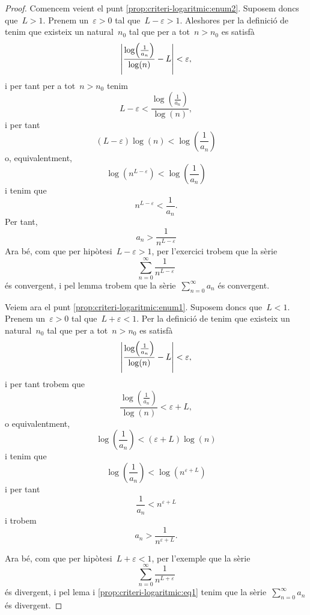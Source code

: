 \documentclass[../analisi-matematica.tex]{subfiles}
\begin{document}
    \begin{proof}
        Comencem veient el punt \eqref{prop:criteri-logaritmic:enum2}.
        Suposem doncs que~\(L>1\).
        Prenem un~\(\varepsilon>0\) tal que~\(L-\varepsilon>1\).
        Aleshores per la definició de  tenim que existeix un natural~\(n_{0}\) tal que per a tot~\(n>n_{0}\) es satisfà
        \[
            \abs{\frac{\log\left(\frac{1}{a_{n}}\right)}{\log(n)}-L}<\varepsilon,
        \]
        i per tant per a tot~\(n>n_{0}\) tenim
        \[
            L-\varepsilon<\frac{\log\left(\frac{1}{a_{n}}\right)}{\log(n)},
        \]
        i per tant
        \[
            (L-\varepsilon)\log(n)<\log\left(\frac{1}{a_{n}}\right)
        \]
        o, equivalentment,
        \[
            \log\left(n^{L-\varepsilon}\right)<\log\left(\frac{1}{a_{n}}\right)
        \]
        i tenim que %
        \[
            n^{L-\varepsilon}<\frac{1}{a_{n}}.
        \]
        Per tant,
        \[
            a_{n}>\frac{1}{n^{L-\varepsilon}}
        \]
        Ara bé, com que per hipòtesi~\(L-\varepsilon>1\), per l'exercici  trobem que la sèrie
        \[
            \sum_{n=0}^{\infty}\frac{1}{n^{L-\varepsilon}}
        \]
        és convergent, i pel lemma  trobem que la sèrie~\(\sum_{n=0}^{\infty}a_{n}\) és convergent.

        Veiem ara el punt \eqref{prop:criteri-logaritmic:enum1}.
        Suposem doncs que~\(L<1\).
        Prenem un~\(\varepsilon>0\) tal que~\(L+\varepsilon<1\).
        Per la definició de  tenim que existeix un natural~\(n_{0}\) tal que per a tot~\(n>n_{0}\) es satisfà
        \[
            \abs{\frac{\log\left(\frac{1}{a_{n}}\right)}{\log(n)}-L}<\varepsilon,
        \]
        i per tant trobem que
        \[
            \frac{\log\left(\frac{1}{a_{n}}\right)}{\log(n)}<\varepsilon+L,
        \]
        o equivalentment,
        \[
            \log\left(\frac{1}{a_{n}}\right)<(\varepsilon+L)\log(n)
        \]
        i tenim que
        \[
            \log\left(\frac{1}{a_{n}}\right)<\log\left(n^{\varepsilon+L}\right)
        \]
        i per tant
        \[
            \frac{1}{a_{n}}<n^{\varepsilon+L}
        \]
        i trobem
        \begin{equation}
            \label{prop:criteri-logaritmic:eq1}
            a_{n}>\frac{1}{n^{\varepsilon+L}}.
        \end{equation}

        Ara bé, com que per hipòtesi~\(L+\varepsilon<1\), per l'exemple  que la sèrie
        \[
            \sum_{n=0}^{\infty}\frac{1}{n^{L+\varepsilon}}
        \]
        és divergent, i pel lema  i \eqref{prop:criteri-logaritmic:eq1} tenim que la sèrie~\(\sum_{n=0}^{\infty}a_{n}\) és divergent.
    \end{proof}
\end{document}
